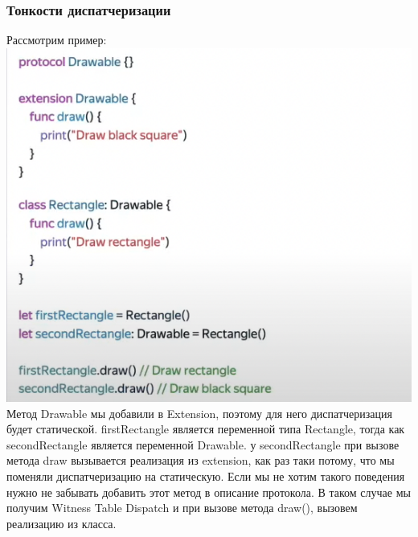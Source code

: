 \documentclass{article}
\begin{document}
    \subsubsection{Тонкости диспатчеризации}
    Рассмотрим пример:
    \newline
    \includegraphics[scale = 0.5]{pic/Снимок экрана 2023-07-28 в 19.41.49.png}
    \newline
    Метод Drawable мы добавили в Extension, поэтому для него диспатчеризация будет статической. 
    \newline
    firstRectangle является переменной типа Rectangle, тогда как secondRectangle является переменной Drawable. 
    \newline
    у secondRectangle при вызове метода draw вызывается реализация из extension, как раз таки потому, что мы поменяли диспатчеризацию на статическую. 
    \newline
    Если мы не хотим такого поведения нужно не забывать добавить этот метод в описание протокола. В таком случае мы получим Witness Table Dispatch и при вызове метода draw(), вызовем реализацию из класса. 
    \newline
\end{document}
